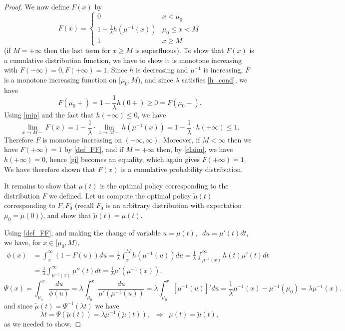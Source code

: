 \documentclass[10pt,a4paper]{amsart}
\begin{document}
\begin{proof}
		We now define $F(x)$ by
		\begin{equation}\label{def_FF}F(x)=\begin{cases}
				0 & x<\mu_0\\
				1-\frac{1}{\lambda}h(\mu^{-1}(x)) & \mu_0\leq x<M\\
				1 & x\geq M
		\end{cases}\end{equation}
		(if $M=+\infty$ then the last term for $x\geq M$ is superfluous). To show that $F(x)$ is 
		a cumulative distribution function, we have to show it is monotone increasing  
		with $F(-\infty)=0,F(+\infty)=1$.
		Since $h$ is decreasing and $\mu^{-1}$ is increasing, 
		$F$ is a monotone increasing function on
		$[\mu_0,M)$, and since 
		$\lambda$ satisfies \eqref{h_cond}, we have
		\begin{equation*}\label{gi0}F(\mu_0+)=1-\frac{1}{\lambda} h(0+)\geq 0= F(\mu_0-).
		\end{equation*}
		Using \eqref{mip} and the fact that $h(+\infty)\leq 0$, we have
		\begin{equation}\label{gi}
			\lim_{x\rightarrow M-} F(x)=1-\frac{1}{\lambda}\cdot
			\lim_{x\rightarrow M-}h(\mu^{-1}(x))=1-\frac{1}{\lambda}\cdot
			h(+\infty)\leq 1.
		\end{equation}
		Therefore $F$ is monotone increasing on 
		$(-\infty,\infty)$. 
		Moreover, if $M<\infty$ then we have
		$F(+\infty)=1$ by \eqref{def_FF}, and if $M=+\infty$ then, by 
		\eqref{claim}, we have $h(+\infty)=0$, hence \eqref{gi} 
		becomes an equality, which again gives $F(+\infty)=1$. 
		We have therefore shown that $F(x)$ 
		is a cumulative probability distribution.
		
		It remains to show that $\mu(t)$ is 
		the optimal policy corresponding to the distribution $F$ we defined. Let us compute 
		the optimal policy $\tilde{\mu}(t)$  corresponding to $F,F_0$ (recall $F_0$ is an arbitrary distribution with expectation $\mu_0=\mu(0)$), and show that $\tilde{\mu}(t)=\mu(t)$.
		
		Using
		\eqref{def_FF}, and making the change of variable $u=\mu(t),\;\;du=\mu'(t)dt$, we have, for 
		$x\in [\mu_0,M)$,
		\begin{align*}\phi(x)&=\int_x^\infty (1-F(u))du
			=\frac{1}{\lambda}\int_x^M h(\mu^{-1}(u))du=\frac{1}{\lambda}\int_{\mu^{-1}(x)}^{\infty} h(t)\mu'(t)dt\\&=\frac{1}{\lambda}\int_{\mu^{-1}(x)}^{\infty} \mu''(t)dt=\frac{1}{\lambda}\mu'(\mu^{-1}(x)),
		\end{align*}
		$$\Psi(x)=\int_{\mu_0}^x \frac{du}{\phi(u)}=\lambda\int_{\mu_0}^x \frac{du}{\mu'(\mu^{-1}(u))}=\lambda\int_{\mu_0}^x [\mu^{-1}(u)]'du=\frac{1}{\lambda}\mu^{-1}(x)-\mu^{-1}(\mu_0)=\lambda\mu^{-1}(x).$$
		and since $\tilde{\mu}(t)=\Psi^{-1}(\lambda t)$ we have
		$$\lambda t=\Psi(\tilde{\mu}(t))=\lambda \mu^{-1}(\tilde{\mu}(t)),\;\;\Rightarrow \;\; \mu(t)=\tilde{\mu}(t),$$
		as we needed to show.
		
		
		
	\end{proof}
\end{document}
